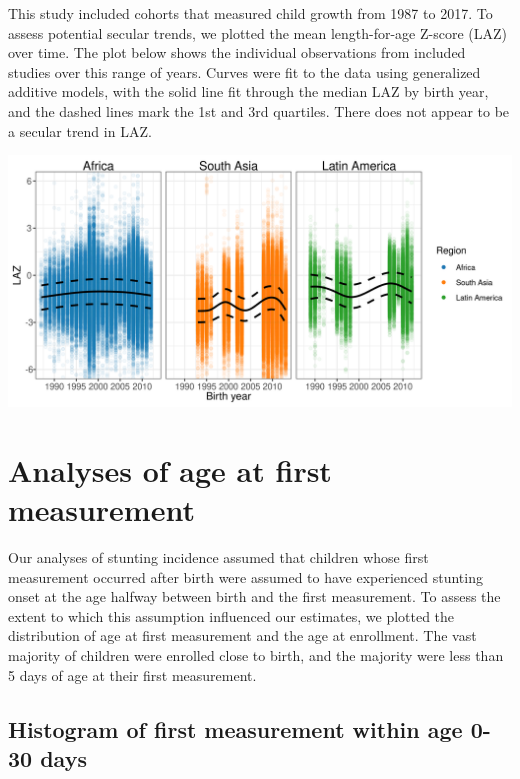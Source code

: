\documentclass[
  9pt,
]{book}
\begin{document}
\raggedright

This study included cohorts that measured child growth from 1987 to 2017. To assess potential secular trends, we plotted the mean length-for-age Z-score (LAZ) over time. The plot below shows the individual observations from included studies over this range of years. Curves were fit to the data using generalized additive models, with the solid line fit through the median LAZ by birth year, and the dashed lines mark the 1st and 3rd quartiles. There does not appear to be a secular trend in LAZ.

\includegraphics[width=33.33in]{figures//shared/laz_secular_trend}

\hypertarget{age-meas}{%
\chapter{Analyses of age at first measurement}\label{age-meas}}

\raggedright

Our analyses of stunting incidence assumed that children whose first measurement occurred after birth were assumed to have experienced stunting onset at the age halfway between birth and the first measurement. To assess the extent to which this assumption influenced our estimates, we plotted the distribution of age at first measurement and the age at enrollment. The vast majority of children were enrolled close to birth, and the majority were less than 5 days of age at their first measurement.

\hypertarget{histogram-of-first-measurement-within-age-0-30-days}{%
\section{Histogram of first measurement within age 0-30 days}\label{histogram-of-first-measurement-within-age-0-30-days}}
\end{document}
